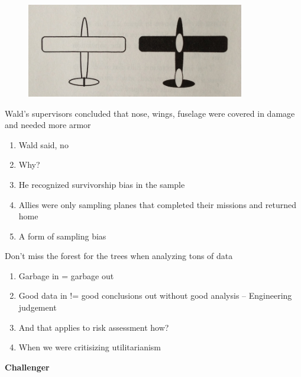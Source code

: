 \documentclass[aspectratio=1610,pdftex,dvipsnames,compress,xcolor={dvipsnames}]{beamer}
\begin{document}
\begin{frame}{}
    \begin{figure}
        \centering
        \includegraphics[width=0.85\textwidth]{wwii.planes.jpg}
    \end{figure}
\end{frame}


\begin{frame}{Wald's supervisors concluded that nose, wings, fuselage were covered in damage and needed more armor}
    \begin{enumerate}[series=outerlist,topsep=0pt,itemsep=21pt,leftmargin=*,label=(\arabic*)]
        \item[]Wald said, no
        \item[]Why?
        \item[]He recognized survivorship bias in the sample
        \item[]Allies were only sampling planes that completed their missions and returned home
        \item[]A form of sampling bias
    \end{enumerate}
\end{frame}


\begin{frame}{Don't miss the forest for the trees when analyzing tons of data}
    \begin{enumerate}[series=outerlist,topsep=0pt,itemsep=21pt,leftmargin=*,label=(\arabic*)]
        \item[]Garbage in = garbage out
        \item[]Good data in != good conclusions out without good analysis -- Engineering judgement
        \item[]And that applies to risk assessment how?  
        \item[]When we were critisizing utilitarianism
    \end{enumerate}
\end{frame}


\begin{frame}[plain]{}
    \centering\LARGE\textbf{Challenger}
\end{frame}
\end{document}
